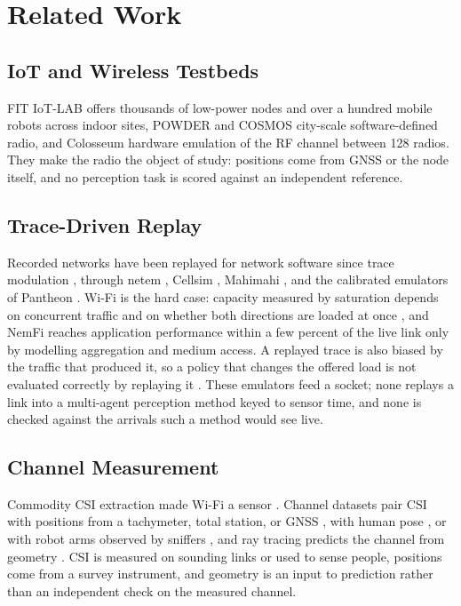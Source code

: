 \section{Related Work}
\label{sec:related}

\subsection{IoT and Wireless Testbeds}
FIT IoT-LAB \cite{adjih2015iotlab} offers thousands of low-power nodes
and over a hundred mobile robots across indoor sites, POWDER
\cite{breen2021powder} and COSMOS \cite{raychaudhuri2020cosmos}
city-scale software-defined radio, and Colosseum
\cite{bonati2021colosseum} hardware emulation of the RF channel between
128 radios. They make the radio the object of study: positions come
from GNSS or the node itself, and no perception task is scored against
an independent reference.

\subsection{Trace-Driven Replay}
Recorded networks have been replayed for network software since trace
modulation \cite{noble1997trace}, through netem \cite{hemminger2005netem},
Cellsim \cite{winstein2013sprout}, Mahimahi \cite{netravali2015mahimahi},
and the calibrated emulators of Pantheon \cite{yan2018pantheon}. Wi-Fi is
the hard case: capacity measured by saturation depends on concurrent
traffic and on whether both directions are loaded at once
\cite{syed2020wifiemu}, and NemFi \cite{nemfi} reaches application
performance within a few percent of the live link only by modelling
aggregation and medium access. A replayed trace is also biased by the
traffic that produced it, so a policy that changes the offered load is
not evaluated correctly by replaying it \cite{causalsim}. These
emulators feed a socket; none replays a link into a multi-agent
perception method keyed to sensor time, and none is checked against the
arrivals such a method would see live.

\subsection{Channel Measurement}
Commodity CSI extraction \cite{halperin2011csitool,nexmon,jiang2022picoscenes}
made Wi-Fi a sensor \cite{ma2019wifisensing}. Channel datasets pair CSI
with positions from a tachymeter, total station, or GNSS
\cite{dichasus,espargos}, with human pose \cite{mmfi}, or with robot
arms observed by sniffers \cite{robomnist}, and ray tracing predicts the
channel from geometry \cite{hoydis2023sionnart,deepmimo}. CSI is
measured on sounding links or used to sense people, positions come from
a survey instrument, and geometry is an input to prediction rather than
an independent check on the measured channel.

